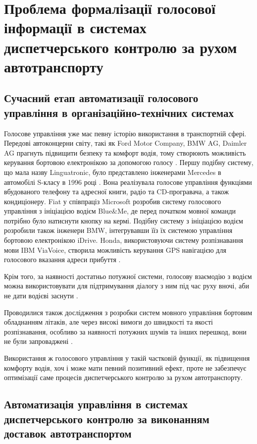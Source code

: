\chapter{Проблема формалізації голосової інформації в системах диспетчерського контролю за рухом автотранспорту} \label{chapt1}


\section{Сучасний етап автоматизації голосового управління в організаційно-технічних системах} \label{sect1_2}

Голосове управління уже має певну історію використання в транспортній сфері. Передові автоконцерни світу, такі як Ford Motor Company, BMW AG, Daimler AG прагнуть підвищити безпеку та комфорт водія, тому створюють можливість керування бортовою електронікою за допомогою голосу \cite{Kravchenko_2009}. Першу подібну систему, що мала назву Linguatronic, було представлено інженерами Mercedes в автомобілі S-класу в 1996 році \cite{Heisterkamp_2001}. Вона реалізувала голосове управління функціями вбудованого телефону та адресної книги, радіо та CD-програвача, а також кондиціонеру. Fiat у співпраціз Microsoft розробив систему голосового управління з ініціацією водієм Blue\&Me, де перед початком мовної команди потрібно було натиснути кнопку на кермі. Подібну систему з ініціацією водієм розробили також інженери BMW, інтегрувавши їїз їх системою управління бортовою електронікою iDrive. Honda, використовуючи систему розпізнавання мови IBM ViaVoice, створила можливість керування GPS навігацією для голосового вказання адреси прибуття \cite{Jonsson_2009}.

Крім того, за наявності достатньо потужної системи, голосову взаємодію з водієм можна використовувати для підтримування діалогу з ним під час руху вночі, аби не дати водієві заснути \cite{Kravchenko_2012}.

Проводилися також дослідження з розробки систем мовного управління бортовим обладнанням літаків, але через високі вимоги до швидкості та якості розпізнавання, особливо за наявності потужних шумів та інших перешкод, вони не були запроваджені \cite{Korsun_2013}.

Використання ж голосового управління у такій частковій функції, як підвищення комфорту водія, хоч і може мати певний позитивний ефект, проте не забезпечує оптимізації саме процесів диспетчерського контролю за рухом автотранспорту.

\section{Автоматизація управління в системах диспетчерського контролю за виконанням доставок автотранспортом} \label{sect1_3}

